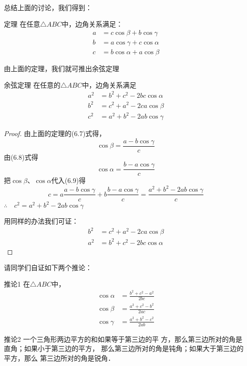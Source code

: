 总结上面的讨论，我们得到：

\begin{blk}
 {定理}
在任意$\triangle ABC$中，边角关系满足：
\begin{align}
 a&=c\cos\beta +b\cos\gamma\\
b&=a\cos\gamma+c\cos\alpha \\
c&=b\cos\alpha +a\cos\beta 
\end{align}  
\end{blk}

由上面的定理，我们就可推出余弦定理

\begin{blk}
    {余弦定理}
在任意的$\triangle ABC$中，边角关系满足
\[\begin{split}
  a^2&=b^2+c^2-2bc\cos\alpha\\
b^2&=c^2+a^2-2ca \cos\beta\\
c^2&=a^2+b^2-2ab\cos\gamma  
\end{split}\]
\end{blk}

\begin{proof}
    由上面的定理的(6.7)式得，
\[\cos\beta=\frac{a-b\cos\gamma}{c}\]
由(6.8)式得
\[\cos\alpha=\frac{b-a\cos\gamma}{c}\]
把$\cos\beta$、$\cos\alpha$代入(6.9)得
\[c=a\frac{a-b\cos\gamma}{c}+b\frac{b-a\cos\gamma}{c}=\frac{a^2+b^2-2ab\cos\gamma}{c}\]
$\therefore\quad c^2=a^2+b^2-2ab\cos\gamma$

用同样的办法我们可证：
\[\begin{split}
   b^2&=c^2+a^2-2ca \cos\beta\\ 
   a^2&=b^2+c^2-2bc\cos\alpha   
\end{split}\]
\end{proof}

请同学们自证如下两个推论：

\begin{blk}{推论1}
在$\triangle ABC$中，
\[\begin{split}
    \cos\alpha&=\frac{b^2+c^2-a^2}{2bc}\\
    \cos\beta&=\frac{a^2+c^2-b^2}{2ac}\\
        \cos\gamma&=\frac{a^2+b^2-c^2}{2ab}
\end{split}\]
\end{blk}

\begin{blk}{推论2}
     一个三角形两边平方的和如果等于第三边的平
方，那么第三边所对的角是直角；如果小于第三边的平方，
那么第三边所对的角是钝角；如果大于第三边的平方，那么
第三边所对的角是锐角．
\end{blk}


